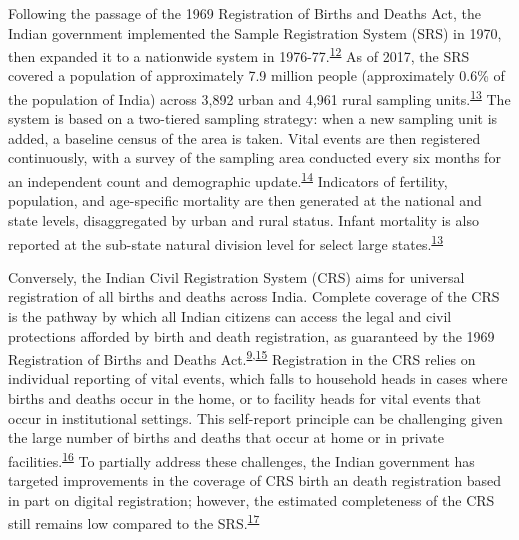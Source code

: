 \documentclass[
]{article}
\begin{document}
Following the passage of the 1969 Registration of Births and Deaths Act, the Indian government implemented the Sample Registration System (SRS) in 1970, then expanded it to a nationwide system in 1976-77.\textsuperscript{\protect\hyperlink{ref-Bhat2002}{12}} As of 2017, the SRS covered a population of approximately 7.9 million people (approximately 0.6\% of the population of India) across 3,892 urban and 4,961 rural sampling units.\textsuperscript{\protect\hyperlink{ref-CensusofIndia2017}{13}} The system is based on a two-tiered sampling strategy: when a new sampling unit is added, a baseline census of the area is taken. Vital events are then registered continuously, with a survey of the sampling area conducted every six months for an independent count and demographic update.\textsuperscript{\protect\hyperlink{ref-Mahapatra2010}{14}} Indicators of fertility, population, and age-specific mortality are then generated at the national and state levels, disaggregated by urban and rural status. Infant mortality is also reported at the sub-state natural division level for select large states.\textsuperscript{\protect\hyperlink{ref-CensusofIndia2017}{13}}

Conversely, the Indian Civil Registration System (CRS) aims for universal registration of all births and deaths across India. Complete coverage of the CRS is the pathway by which all Indian citizens can access the legal and civil protections afforded by birth and death registration, as guaranteed by the 1969 Registration of Births and Deaths Act.\textsuperscript{\protect\hyperlink{ref-ParliamentoftheRepublicofIndia1969}{9},\protect\hyperlink{ref-Abouzahr2007}{15}} Registration in the CRS relies on individual reporting of vital events, which falls to household heads in cases where births and deaths occur in the home, or to facility heads for vital events that occur in institutional settings. This self-report principle can be challenging given the large number of births and deaths that occur at home or in private facilities.\textsuperscript{\protect\hyperlink{ref-Mohanty2018}{16}} To partially address these challenges, the Indian government has targeted improvements in the coverage of CRS birth an death registration based in part on digital registration; however, the estimated completeness of the CRS still remains low compared to the SRS.\textsuperscript{\protect\hyperlink{ref-Kumar2019}{17}}
\end{document}

